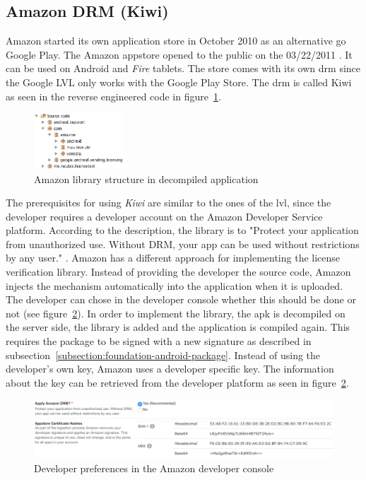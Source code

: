 \subsection{Amazon DRM (Kiwi)} \label{section:license-amazon}
Amazon started its own application store in October 2010 \cite{amazonBeta} as an alternative go Google Play.
The Amazon appstore opened to the public on the 03/22/2011 \cite{amazonRelease}.
It can be used on Android and \textit{Fire} tablets.
The store comes with its own \gls{drm} since the Google LVL only works with the Google Play Store.
The \gls{drm} is called Kiwi as seen in the reverse engineered code in figure~\ref{fig:amazonFolder}.
\newline
\begin{figure}[h]
    \centering
    \includegraphics[width=0.3\textwidth]{data/amazonFolder.png}
    \caption{Amazon library structure in decompiled application}
    \label{fig:amazonFolder}
\end{figure}
The prerequisites for using \textit{Kiwi} are similar to the ones of the \gls{lvl}, since the developer requires a developer account on the Amazon Developer Service platform.
According to the description, the library is to "Protect your application from unauthorized use. Without DRM, your app can be used without restrictions by any user." \cite{amazonDeveloper}.
\newline
Amazon has a different approach for implementing the license verification library.
Instead of providing the developer the source code, Amazon injects the mechanism automatically into the application when it is uploaded.
The developer can chose in the developer console whether this should be done or not (see figure~\ref{fig:amazon}).
In order to implement the library, the \gls{apk} is decompiled on the server side, the library is added and the application is compiled again.
This requires the package to be signed with a new signature as described in subsection~\ref{subsection:foundation-android-package}.
Instead of using the developer's own key, Amazon uses a developer specific key.
The information about the key can be retrieved from the developer platform as seen in figure~\ref{fig:amazon}. \cite{amazonDeveloper}
\newline
\begin{figure}[h]
    \centering
    \includegraphics[width=1\textwidth]{data/amazon.png}
    \caption{Developer preferences in the Amazon developer console \cite{amazonDeveloper}}
    \label{fig:amazon}
\end{figure}
